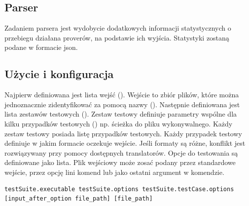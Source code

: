 \documentclass[a4paper,12pt]{article}
\begin{document}
\begin{itemize}
\newpage
\subsection{Parser} \label{parser}

Zadaniem parsera jest wydobycie dodatkowych informacji statystycznych o przebiegu działana proverów, na podstawie ich wyjścia. Statystyki zostaną podane w formacie json.


\subsection{Użycie i konfiguracja} \label{benchmarkUsage}

Najpierw definiowana jest lista wejść (). Wejście to zbiór plików, które można jednoznacznie zidentyfikować za pomocą nazwy ().
Następnie definiowana jest lista zestawów testowych (). Zestaw testowy definiuje parametry wspólne dla kilku przypadków testowych () np. ścieżka do pliku wykonywalnego. Każdy zestaw testowy posiada listę przypadków testowych. Każdy przypadek testowy definiuje w jakim formacie oczekuje wejście. Jeśli formaty są różne, konflikt jest rozwiązywany przy pomocy dostępnych translatorów. Opcje do testowania są definiowane jako lista. Plik wejściowy może zosać podany przez standardowe wejście, przez opcję lini komend lub jako ostatni argument w komendzie.

\begin{verbatim}
testSuite.executable testSuite.options testSuite.testCase.options [input_after_option file_path] [file_path]
\end{verbatim}


\end{itemize}
\end{document}

